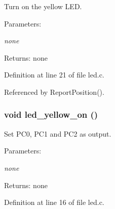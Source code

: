 Turn on the yellow LED. 

\begin{Desc}
\item[Parameters:]
\begin{description}
\item[{\em none}]\end{description}
\end{Desc}
\begin{Desc}
\item[Returns:]none \end{Desc}


Definition at line 21 of file led.c.

Referenced by ReportPosition().
\subsubsection{\setlength{\rightskip}{0pt plus 5cm}void led\_\-yellow\_\-on ()}\label{led_8c_343d41d3b6e13512551ca21bf3ed1881}


Set PC0, PC1 and PC2 as output. 

\begin{Desc}
\item[Parameters:]
\begin{description}
\item[{\em none}]\end{description}
\end{Desc}
\begin{Desc}
\item[Returns:]none \end{Desc}


Definition at line 16 of file led.c.